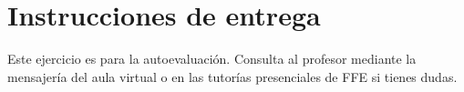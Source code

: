 \section{Instrucciones de entrega}
Este ejercicio es para la autoevaluación. Consulta al profesor mediante la mensajería del aula virtual o en las tutorías presenciales de FFE si tienes dudas.




